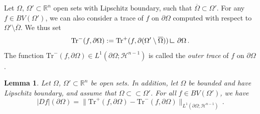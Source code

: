 \documentclass[a4paper,reqno,11pt]{amsart}
\newtheorem{lemma}[theorem]{Lemma}
\newcommand{\R}{\mathbb{R}}
\newcommand{\Hau}{{\mathcal H}} %
\newcommand{\de}{\partial}
\newcommand{\ch}{\mathbf{1}}
\newcommand{\restrict}{\mathbin{\vrule height 1.4ex depth 0pt width
		0.13ex\vrule height 0.13ex depth 0pt width 1.3ex}\,}
\newcommand{\Tr}{{\mathrm{Tr}}}
\newcommand{\footred}[1]{%
	\renewcommand\thefootnote{\textcolor{red}{\arabic{footnote}}}%
	\footnote{\color{red} #1}%
	\renewcommand\thefootnote{\textcolor{black}{\arabic{footnote}}}%
}
\newcommand{\footredGP}[1]{\footred{GP: #1}}
\begin{document}
	Let $\Omega$, $\Omega' \subset \R^{n}$ open sets with Lipschitz boundary, such that $\overline{\Omega} \subset \Omega'$. For any $f \in BV(\Omega')$, we can also consider a trace of $f$ on $\de\Omega$ computed with respect to $\Omega' \setminus \overline{\Omega}$. We thus set 
\[
\Tr^{-}(f, \de \Omega) := \Tr^{+}(f,\de  (\Omega' \setminus \overline{\Omega}))\restrict \de \Omega\,.
\] 
The function $\Tr^{-} (f,\de \Omega) \in L^{1}(\de \Omega; \Hau^{n-1})$ is called the \emph{outer trace} of $f$ on $\de\Omega$. 
\begin{lemma} \label{lem:extBV}
Let $\Omega$, $\Omega' \subset \R^{n}$ be open sets. In addition, let $\Omega$ be bounded and have Lipschitz boundary, and assume that $\Omega \subset \subset \Omega'$. For all $f \in BV(\Omega')$, we have
\begin{equation} \label{eq:extBV}
|Df|(\de\Omega) = \|\Tr^{+}(f, \de \Omega) - \Tr^{-}(f, \de \Omega)\|_{L^{1}(\de \Omega; \Hau^{n-1})} \, .
\end{equation}
\end{lemma}
\end{document}
